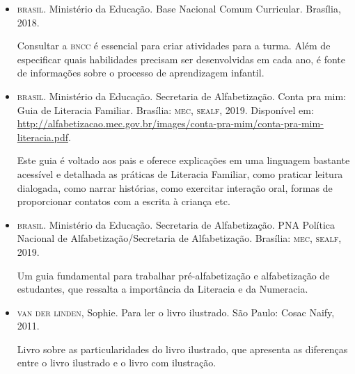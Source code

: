 \documentclass[11pt]{extarticle}
\begin{document}
\begin{itemize}
\item \textsc{brasil}. Ministério da Educação. Base Nacional Comum Curricular. Brasília, 2018.

Consultar a \textsc{bncc} é essencial para criar atividades para a turma. Além de especificar 
quais habilidades precisam ser desenvolvidas em cada ano, é fonte de informações sobre 
o processo de aprendizagem infantil. 

\item \textsc{brasil}. Ministério da Educação. Secretaria de Alfabetização. Conta pra mim: Guia de Literacia Familiar. 
Brasília: \textsc{mec, sealf}, 2019. Disponível em: \url{http://alfabetizacao.mec.gov.br/images/conta-pra-mim/conta-pra-mim-literacia.pdf}.

Este guia é voltado aos pais e oferece explicações em uma linguagem bastante acessível e detalhada as práticas de Literacia Familiar, 
como praticar leitura dialogada, como narrar histórias, como exercitar interação oral, formas de proporcionar contatos com a escrita à criança etc. 
 
\item \textsc{brasil}. Ministério da Educação. Secretaria de Alfabetização. PNA Política Nacional de Alfabetização/Secretaria 
de Alfabetização. Brasília: \textsc{mec, sealf}, 2019.

Um guia fundamental para trabalhar pré-alfabetização e alfabetização de estudantes, que ressalta a importância da Literacia e da Numeracia. 

\item \textsc{van der linden}, Sophie. Para ler o livro ilustrado. São Paulo: Cosac Naify, 2011.

Livro sobre as particularidades do livro ilustrado, que apresenta as diferenças entre o livro ilustrado e o livro com ilustração. 
\end{itemize}

\end{document}

